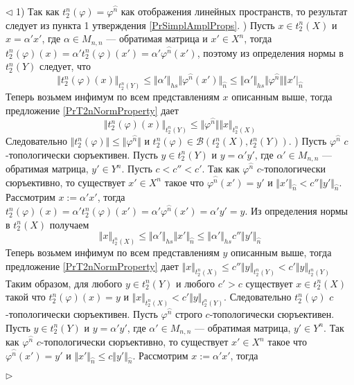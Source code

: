 \documentclass[12pt]{article}
\newenvironment{proof}{\par $\triangleleft$}{$\triangleright$}
\begin{document}
\begin{proof}
1) Так как $t_2^n(\varphi)=\varphi^{\wideparen{n}}$ как отображения линейных пространств, то результат следует из пункта 1 утверждения \ref{PrSimplAmplProps}. 
) Пусть $x\in t_2^n(X)$ и $x=\alpha'x'$, где $\alpha\in M_{n,n}$ --- обратимая матрица и $x'\in X^{n}$, тогда $t_2^n(\varphi)(x)=\alpha't_2^n(\varphi)(x')=\alpha'\varphi^{\wideparen{n}}(x')$, поэтому из 
определения нормы в $t_2^n(Y)$ следует, что
$$
\Vert t_2^n(\varphi)(x)\Vert_{t_2^n(Y)}
\leq\Vert\alpha'\Vert_{hs}\Vert\varphi^{\wideparen{n}}(x')\Vert_{\wideparen{n}}
\leq\Vert\alpha'\Vert_{hs}\Vert\varphi^{\wideparen{n}}\Vert\Vert x'\vert_{\wideparen{n}}
$$
Теперь возьмем инфимум по всем представлениям $x$ описанным выше, тогда предложение \ref{PrT2nNormProperty} дает
$$
\Vert t_2^n(\varphi)(x)\Vert_{t_2^n(Y)}\leq\Vert\varphi^{\wideparen{n}}\Vert\Vert x\Vert_{t_2^n(X)}
$$
Следовательно $\Vert t_2^n(\varphi)\Vert\leq\Vert\varphi^{\wideparen{n}}\Vert$ и $t_2^n(\varphi)\in\mathcal{B}(t_2^n(X),t_2^n(Y))$.
) Пусть $\varphi^{\wideparen{n}}$  $c$-топологически сюръективен. Пусть $y\in t_2^n(Y)$ и $y=\alpha' y'$, где $\alpha'\in M_{n,n}$ --- обратимая матрица, $y'\in Y^n$. Пусть $c<c''<c'$. Так как 
$\varphi^{\wideparen{n}}$ $c$-топологически сюръективно, то существует $x'\in X^n$ такое что $\varphi^{\wideparen{n}}(x')=y'$ и $\Vert x'\Vert_{\wideparen{n}}< c''\Vert y'\Vert_{\wideparen{n}}$. Рассмотрим 
$x:=\alpha'x'$, тогда $t_2^n(\varphi)(x)=\alpha't_2^n(\varphi)(x')=\alpha'\varphi^{\wideparen{n}}(x')=\alpha' y'=y$. Из определения нормы в $t_2^n(X)$ получаем
$$
\Vert x\Vert_{t_2^n(X)}
\leq\Vert\alpha'\Vert_{hs}\Vert x'\Vert_{\wideparen{n}}
\leq\Vert\alpha'\Vert_{hs} c''\Vert y'\Vert_{\wideparen{n}}
$$
Теперь возьмем инфимум по всем представлениям $y$ описанным выше, тогда предложение \ref{PrT2nNormProperty} дает $\Vert x\Vert_{t_2^n(X)}\leq c''\Vert y\Vert_{t_2^n(Y)}<c'\Vert y\Vert_{t_2^n(Y)}$
Таким образом, для любого $y\in t_2^n(Y)$ и любого $c'>c$ существует $x\in t_2^n(X)$ такой что $t_2^n(\varphi)(x)=y$ и $\Vert x\Vert_{t_2^n(X)}< c'\Vert y\Vert_{t_2^n(Y)}$. Следовательно $t_2^n(\varphi)$ 
$c$-топологически сюръективен.
\newline
Пусть $\varphi^{\wideparen{n}}$ строго $c$-топологически сюръективен. Пусть $y\in t_2^n(Y)$ и $y=\alpha' y'$, где $\alpha'\in M_{n,n}$ --- обратимая матрица, $y'\in Y^n$. Так как $\varphi^{\wideparen{n}}$ $c$-топологически 
сюръективно, то существует $x'\in X^n$ такое что $\varphi^{\wideparen{n}}(x')=y'$ и $\Vert x'\Vert_{\wideparen{n}}\leq c\Vert y'\Vert_{\wideparen{n}}$. Рассмотрим $x:=\alpha'x'$, тогда 

\end{proof}
\end{document}
